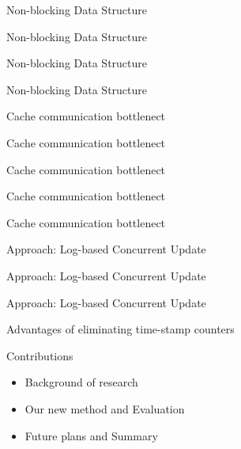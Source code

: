 \documentclass[english]{beamer} %
\begin{document}
\begin{frame}{Non-blocking Data Structure}
\end{frame}


\begin{frame}{Non-blocking Data Structure}
\end{frame}


\begin{frame}{Non-blocking Data Structure}
\end{frame}


\begin{frame}{Non-blocking Data Structure}
\end{frame}


\begin{frame}{Cache communication bottlenect}
\end{frame}


\begin{frame}{Cache communication bottlenect}
\end{frame}


\begin{frame}{Cache communication bottlenect}
\end{frame}


\begin{frame}{Cache communication bottlenect}
\end{frame}

\begin{frame}{Cache communication bottlenect}
\end{frame}



\begin{frame}{Approach: Log-based Concurrent Update}
\end{frame}


\begin{frame}{Approach: Log-based Concurrent Update}
\end{frame}


\begin{frame}{Approach: Log-based Concurrent Update}
\end{frame}


\begin{frame}{Advantages of eliminating time-stamp counters}
\end{frame}


\begin{frame}{Contributions}
	\begin{itemize}
	\item Background of research 
	\item Our new method and Evaluation
	\item Future plans and Summary
	\end{itemize}
\end{frame}
\end{document}
